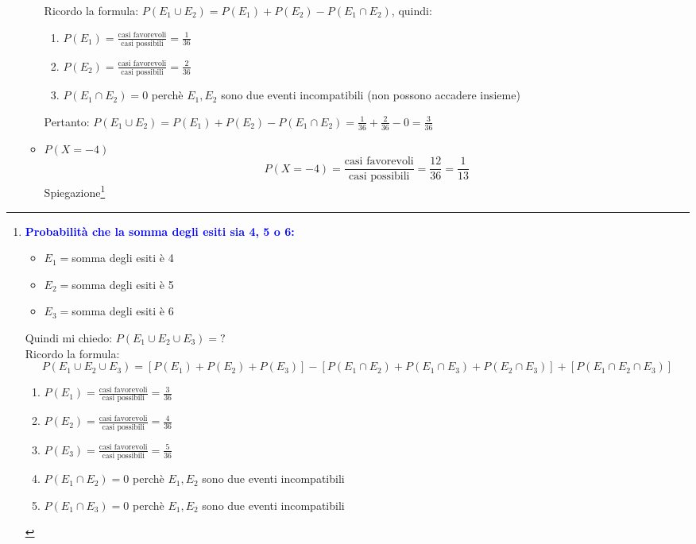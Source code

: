 \documentclass{article}  %
\theoremstyle{definition}
\begin{document}
\begin{esercizio}[Esercizio]
\begin{enumerate}
\begin{itemize}
{				            Ricordo la formula: $P(E_1 \cup E_2)=P(E_1)+P(E_2)-P(E_1 \cap E_2)$, quindi:
				            \begin{enumerate}
					            \item $P(E_1)=\frac{\text{casi favorevoli}}{\text{casi possibili}}=\frac{1}{36}$
					            \item $P(E_2)=\frac{\text{casi favorevoli}}{\text{casi possibili}}=\frac{2}{36}$
					            \item $P(E_1 \cap E_2)=0$ perchè $E_1,E_2$ sono due eventi incompatibili (non possono accadere insieme)
				            \end{enumerate}
				            Pertanto: $P(E_1 \cup E_2)=P(E_1)+P(E_2)-P(E_1 \cap E_2)=\frac{1}{36}+\frac{2}{36}-0=\frac{3}{36}$
			            }
			      \item $P(X=-4)$
			            \[
				            P(X=-4)=\frac{\text{casi favorevoli}}{\text{casi possibili}}=\frac{12}{36}=\frac{1}{13}
			            \]
			            Spiegazione\footnote{\tiny
				            \textcolor{blue}{\textbf{Probabilità che la somma degli esiti sia 4, 5 o 6:}}
				            \begin{itemize}
					            \item $E_1=$somma degli esiti è 4
					            \item $E_2=$somma degli esiti è 5
					            \item $E_3=$somma degli esiti è 6
				            \end{itemize}
				            Quindi mi chiedo: $P(E_1 \cup E_2 \cup E_3)=?$ \\
				            Ricordo la formula:
				            \[
					            P(E_1 \cup E_2 \cup E_3)=\left[P(E_1)+P(E_2)+P(E_3)\right]-\left[P(E_1 \cap E_2)+P(E_1 \cap E_3)+P(E_2 \cap E_3)\right]+\left[P(E_1 \cap E_2 \cap E_3)\right]
				            \]
				            \begin{enumerate}
					            \item $P(E_1)=\frac{\text{casi favorevoli}}{\text{casi possibili}}=\frac{3}{36}$
					            \item $P(E_2)=\frac{\text{casi favorevoli}}{\text{casi possibili}}=\frac{4}{36}$
					            \item $P(E_3)=\frac{\text{casi favorevoli}}{\text{casi possibili}}=\frac{5}{36}$
					            \item $P(E_1 \cap E_2)=0$ perchè $E_1,E_2$ sono due eventi incompatibili
					            \item $P(E_1 \cap E_3)=0$ perchè $E_1,E_2$ sono due eventi incompatibili

\end{enumerate}}
\end{itemize}
\end{enumerate}
\end{esercizio}
\end{document}
